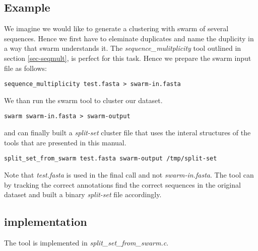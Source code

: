 \subsection{Example}
We imagine we would like to generate a clustering with swarm of
several sequences. Hence we first have to eleminate duplicates and
name the duplicity in a way that swarm understands it. The
\emph{sequence\_mulitplicity} tool outlined in section
\ref{sec-seqmult}, is perfect for this task. Hence we prepare the
swarm input file as follows:
\begin{lstlisting}
sequence_multiplicity test.fasta > swarm-in.fasta
\end{lstlisting}
We than run the swarm tool to cluster our dataset.
\begin{lstlisting}
swarm swarm-in.fasta > swarm-output
\end{lstlisting}
and can finally built a \emph{split-set} cluster file that uses the interal
structures of the tools that are presented in this
manual.
\begin{lstlisting}
split_set_from_swarm test.fasta swarm-output /tmp/split-set
\end{lstlisting}
Note that \emph{test.fasta} is used in the final call and not
\emph{swarm-in.fasta}. The tool can by tracking the correct
annotations find the correct sequences in the original dataset and
built a binary \emph{split-set} file accordingly.

\subsection{implementation}
The tool is implemented in \emph{split\_set\_from\_swarm.c}.
